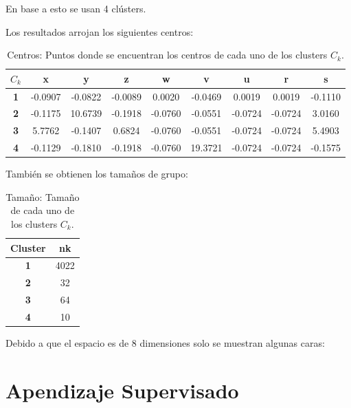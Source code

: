 \documentclass[13.6pt]{article}
\begin{document}
En base a esto se usan 4 clústers.

Los resultados arrojan los siguientes centros:

\begin{table}[h]\centering
\caption{Centros: Puntos donde se encuentran los centros de cada uno de los clusters $C_k$.}

\begin{tabular}{ccccccccc}
\hline
\textbf{$C_k$} & \textbf{x} & \textbf{y} & \textbf{z} & \textbf{w} & \textbf{v} & \textbf{u} & \textbf{r} & \textbf{s} \\ \hline
\textbf{1}       & -0.0907  & -0.0822  & -0.0089  & 0.0020   & -0.0469  & 0.0019   & 0.0019   & -0.1110  \\
\textbf{2}       & -0.1175  & 10.6739  & -0.1918  & -0.0760  & -0.0551  & -0.0724  & -0.0724  & 3.0160   \\
\textbf{3}       & 5.7762   & -0.1407  & 0.6824   & -0.0760  & -0.0551  & -0.0724  & -0.0724  & 5.4903   \\
\textbf{4}       & -0.1129  & -0.1810  & -0.1918  & -0.0760  & 19.3721  & -0.0724  & -0.0724  & -0.1575  \\ \hline
\end{tabular}
\end{table}

También se obtienen los tamaños de grupo:

\begin{table}[h]\centering
\caption{Tamaño: Tamaño de cada uno de los clusters $C_k$.}
\begin{tabular}{cc}
\hline
\textbf{Cluster} & \textbf{nk} \\ \hline
\textbf{1}       & 4022        \\
\textbf{2}       & 32          \\
\textbf{3}       & 64          \\
\textbf{4}       & 10          \\ \hline
\end{tabular}
\end{table}

Debido a que el espacio es de 8 dimensiones solo se muestran algunas caras:





\section{Apendizaje Supervisado}
\end{document}
